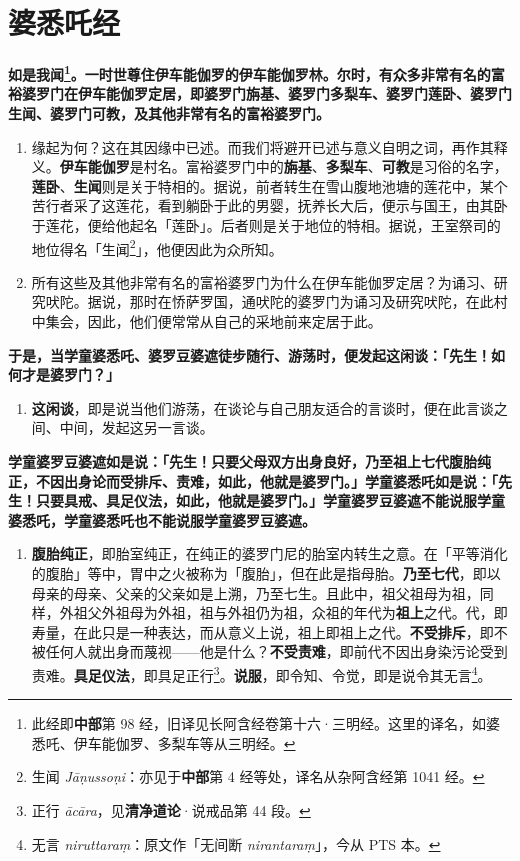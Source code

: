 \section{婆悉吒经}

\textbf{如是我闻\footnote{此经即\textbf{中部}第 98 经，旧译见长阿含经卷第十六·三明经。这里的译名，如婆悉吒、伊车能伽罗、多梨车等从三明经。}。一时世尊住伊车能伽罗的伊车能伽罗林。尔时，有众多非常有名的富裕婆罗门在伊车能伽罗定居，即婆罗门旃基、婆罗门多梨车、婆罗门莲卧、婆罗门生闻、婆罗门可教，及其他非常有名的富裕婆罗门。}

\begin{enumerate}\item 缘起为何？这在其因缘中已述。而我们将避开已述与意义自明之词，再作其释义。\textbf{伊车能伽罗}是村名。富裕婆罗门中的\textbf{旃基}、\textbf{多梨车}、\textbf{可教}是习俗的名字，\textbf{莲卧}、\textbf{生闻}则是关于特相的。据说，前者转生在雪山腹地池塘的莲花中，某个苦行者采了这莲花，看到躺卧于此的男婴，抚养长大后，便示与国王，由其卧于莲花，便给他起名「莲卧」。后者则是关于地位的特相。据说，王室祭司的地位得名「生闻\footnote{生闻 \textit{Jāṇussoṇi}：亦见于\textbf{中部}第 4 经等处，译名从杂阿含经第 1041 经。}」，他便因此为众所知。
\item 所有这些及其他非常有名的富裕婆罗门为什么在伊车能伽罗定居？为诵习、研究吠陀。据说，那时在㤭萨罗国，通吠陀的婆罗门为诵习及研究吠陀，在此村中集会，因此，他们便常常从自己的采地前来定居于此。\end{enumerate}

\textbf{于是，当学童婆悉吒、婆罗豆婆遮徒步随行、游荡时，便发起这闲谈：「先生！如何才是婆罗门？」}

\begin{enumerate}\item \textbf{这闲谈}，即是说当他们游荡，在谈论与自己朋友适合的言谈时，便在此言谈之间、中间，发起这另一言谈。\end{enumerate}

\textbf{学童婆罗豆婆遮如是说：「先生！只要父母双方出身良好，乃至祖上七代腹胎纯正，不因出身论而受排斥、责难，如此，他就是婆罗门。」学童婆悉吒如是说：「先生！只要具戒、具足仪法，如此，他就是婆罗门。」学童婆罗豆婆遮不能说服学童婆悉吒，学童婆悉吒也不能说服学童婆罗豆婆遮。}

\begin{enumerate}\item \textbf{腹胎纯正}，即胎室纯正，在纯正的婆罗门尼的胎室内转生之意。在「平等消化的腹胎」等中，胃中之火被称为「腹胎」，但在此是指母胎。\textbf{乃至七代}，即以母亲的母亲、父亲的父亲如是上溯，乃至七生。且此中，祖父祖母为祖，同样，外祖父外祖母为外祖，祖与外祖仍为祖，众祖的年代为\textbf{祖上}之代。代，即寿量，在此只是一种表达，而从意义上说，祖上即祖上之代。\textbf{不受排斥}，即不被任何人就出身而蔑视——他是什么？\textbf{不受责难}，即前代不因出身染污论受到责难。\textbf{具足仪法}，即具足正行\footnote{正行 \textit{ācāra}，见\textbf{清净道论}·说戒品第 44 段。}。\textbf{说服}，即令知、令觉，即是说令其无言\footnote{无言 \textit{niruttaraṃ}：原文作「无间断 \textit{nirantaraṃ}」，今从 PTS 本。}。\end{enumerate}

